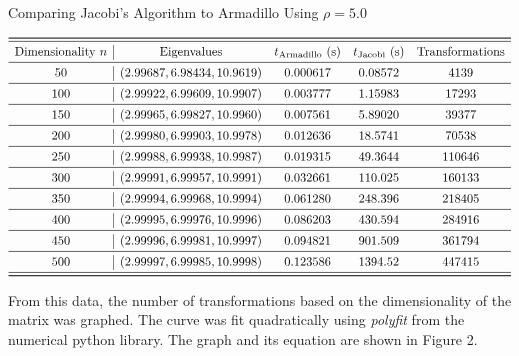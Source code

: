\documentclass[11pt]{article}
\begin{document}
    \begin{table}[H]
    \caption{Comparing Jacobi's Algorithm to Armadillo Using $\rho = 5.0$}
    \[
    \begin{array}{c|cccc}
    \toprule \midrule
    \text{Dimensionality $n$} & \text{Eigenvalues} & t_\text{Armadillo} \text{ (s)} & t_\text{Jacobi} \text{ (s)} & \text{Transformations} \\ \midrule
     50   &  (2.99687, 6.98434, 10.9619)  &   0.000617    &    0.08572    &     4139 \\ \midrule
    100   &  (2.99922, 6.99609, 10.9907)  &    0.003777  &        1.15983  &      17293 \\ \midrule
    150  &   (2.99965, 6.99827, 10.9960)  &    0.007561    &      5.89020    &    39377 \\ \midrule
     200   &  (2.99980, 6.99903, 10.9978) &      0.012636       &  18.5741  &      70538 \\ \midrule
    250  &   (2.99988, 6.99938, 10.9987)   &    0.019315       &   49.3644     &  110646 \\ \midrule
    300  &   (2.99991, 6.99957, 10.9991)    &   0.032661  &        110.025   &    160133 \\ \midrule
    350  &   (2.99994, 6.99968, 10.9994)    &   0.061280     &     248.396      & 218405 \\ \midrule
    400  &   (2.99995, 6.99976, 10.9996)    &   0.086203     &     430.594    &   284916 \\ \midrule
    450  &   (2.99996, 6.99981, 10.9997)    &   0.094821  &        901.509   &    361794 \\ \midrule
    500  &   (2.99997, 6.99985, 10.9998)   &     0.123586   &       1394.52     &  447415 \\ \midrule
    \bottomrule
    \end{array}
    \] 
    \end{table}

    From this data, the number of transformations based on the dimensionality of the matrix was graphed. The curve was fit quadratically using {\em polyfit} from the numerical python library. The graph and its equation are shown in Figure 2.
\end{document}
